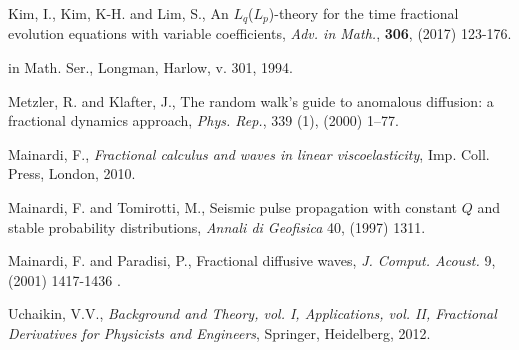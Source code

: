 \documentclass[12pt,reqno]{amsart}
\begin{document}
\begin{thebibliography}{}
				  Kim, I., Kim, K-H. and Lim, S., An $L_q$($L_p$)-theory for the time fractional evolution equations with variable coefficients, {\it Adv. in Math.}, {\bf 306},  (2017) 123-176.
				
				
				in Math. Ser., Longman, Harlow, v. 301, 1994.
				
				
				
				
				
				  Metzler, R. and Klafter, J., The random walk’s guide to anomalous diffusion: a fractional dynamics approach, {\it Phys. Rep.}, { 339} (1), (2000) 1–77.
				
				 Mainardi, F., {\it Fractional calculus and waves in linear viscoelasticity}, Imp. Coll. Press, London, 2010.
				
				  Mainardi, F. and Tomirotti, M.,  Seismic pulse propagation with constant $Q$ and stable probability distributions, {\it Annali di Geofisica} { 40}, (1997) 1311.
				
				  Mainardi, F. and Paradisi, P.,  Fractional diffusive waves, {\it J. Comput. Acoust.} { 9}, (2001) 1417-1436 .
				
				
				
				
				
				
				
				
				
				
				
				
				
				
				
				 Uchaikin, V.V.,  {\it Background and Theory, vol. I, Applications, vol. II, Fractional Derivatives for Physicists and Engineers}, Springer, Heidelberg, 2012.
				
				
				
			\end{thebibliography}
			
			
			
			
			
			
			
		
\end{document}
